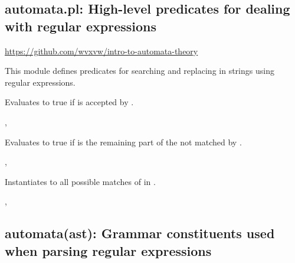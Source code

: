 


\subsection{automata.pl: High-level predicates for dealing with regular expressions}

\label{sec:automata}

\begin{tags}
\url{https://github.com/wvxvw/intro-to-automata-theory}
\end{tags}

This module defines predicates for searching and replacing in strings
using regular expressions.\vspace{0.7cm}

\begin{description}
Evaluates to true if  is accepted by .

\begin{tags}
, 
\end{tags}

Evaluates to true if  is the remaining part of the 
not matched by .

\begin{tags}
, 
\end{tags}

Instantiates  to all possible matches of  in .

\begin{tags}
, 
\end{tags}
\end{description}

\subsection{automata(ast): Grammar constituents used when parsing regular expressions}

\label{sec:ast}

